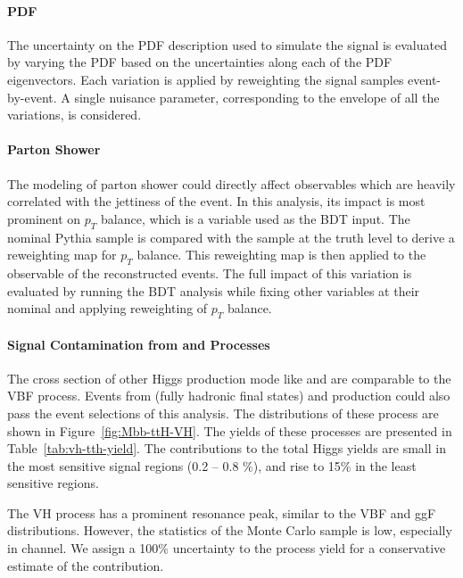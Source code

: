 \paragraph{PDF}
The uncertainty on the PDF description used to simulate the signal is evaluated
by varying the PDF based on the uncertainties along each of the PDF eigenvectors.
Each variation is applied by reweighting the signal samples event-by-event.
A single nuisance parameter, corresponding to the envelope of all the variations,
is considered.

\paragraph{Parton Shower}

The modeling of parton shower could directly affect observables which are heavily 
correlated with the jettiness of the event. In this analysis, its impact is most 
prominent on $p_{T}$ balance, which is a variable used as the BDT input. The nominal
Pythia sample is compared with the \herwig{} sample at the truth level to derive a 
reweighting map for $p_{T}$ balance.
This reweighting map is then applied to the observable of the reconstructed events. The full impact of this variation 
is evaluated by running the BDT analysis while fixing other variables at their nominal 
and applying reweighting of $p_{T}$ balance. 


\paragraph{Signal Contamination from \VH and \ttH Processes}

The cross section of other Higgs production mode like \VH and \ttH are comparable to
the VBF process. Events from \VH (fully hadronic final states) and \ttH production could 
also pass the event selections of this analysis. The \Mbb distributions of these process
 are shown in Figure~\ref{fig:Mbb-ttH-VH}. The yields of these processes are presented 
in Table~\ref{tab:vh-tth-yield}.  The contributions to the total Higgs yields are  small 
in the most sensitive signal regions (0.2 -- 0.8 \%),  and rise to 15\% in the least sensitive regions.  

The VH process has a prominent resonance peak, similar to the VBF and ggF distributions. However, 
the statistics of the Monte Carlo sample is low, especially in \twocentral channel. 
We assign a 100\% uncertainty to the \VH process yield for a conservative estimate of 
the \VH contribution. %

